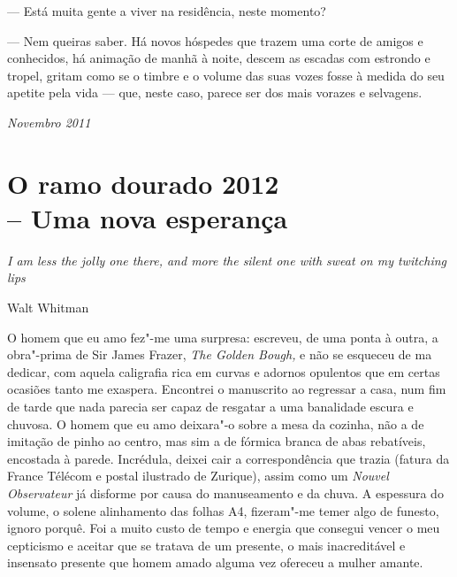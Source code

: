 --- Está muita gente a viver na residência, neste momento?

--- Nem queiras saber. Há novos hóspedes que trazem uma corte de amigos e
  conhecidos, há animação de manhã à
noite, descem as escadas com estrondo e tropel, gritam como se o timbre
e o volume das suas vozes fosse à medida do seu apetite pela vida ---
que, neste caso, parece ser dos mais vorazes e selvagens.

\begin{flushright}
\emph{Novembro 2011}
\end{flushright}

\chapter{O ramo dourado 2012\\
-- Uma nova esperança}

\epigraph{\emph{I am less the jolly one there, and more the silent one with
sweat on my twitching lips}}{Walt Whitman}

O homem que eu amo fez"-me uma surpresa: escreveu, de uma ponta à outra, a
obra"-prima de Sir James Frazer,
\emph{The Golden Bough, }e não se esqueceu de ma dedicar, com aquela
caligrafia rica em curvas e adornos opulentos que em certas ocasiões
tanto me exaspera. Encontrei o manuscrito ao regressar a casa, num fim
de tarde que nada parecia ser capaz de resgatar a uma banalidade escura
e chuvosa. O homem que eu amo deixara"-o sobre a mesa da cozinha, não a
de imitação de pinho ao centro, mas sim a de fórmica branca de abas
rebatíveis, encostada à parede. Incrédula, deixei cair a correspondência que trazia (fatura da France Télécom e postal ilustrado de
Zurique), assim como um \emph{Nouvel Observateur }já disforme por causa
do manuseamento e da chuva. A espessura do volume, o solene
alinhamento das folhas A4, fizeram"-me temer algo de funesto, ignoro porquê. Foi a muito custo de tempo e
energia que consegui vencer o meu cepticismo e aceitar que se tratava de
um presente, o mais inacreditável e insensato presente que homem amado
alguma vez ofereceu a mulher amante.

